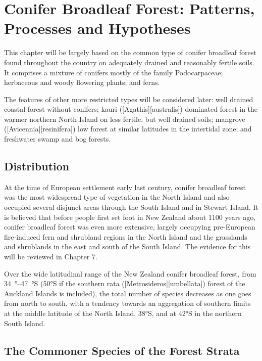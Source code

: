 \chapter{Conifer Broadleaf Forest: Patterns, Processes and Hypotheses}

This chapter will be largely based on the common type of conifer broadleaf forest found throughout the country on adequately drained and reasonably fertile soils.
It comprises a mixture of conifers mostly of the family Podocarpaceae; herbaceous and woody flowering plants; and ferns.

The features of other more restricted types will be considered later: well drained coastal forest without conifers; kauri ([Agathis][australis]) dominated forest in the warmer northern North Island on less fertile, but well drained soils; mangrove ([Avicennia][resinifera]) low forest at similar latitudes in the intertidal zone; and freshwater swamp and bog forests.

\section{Distribution}

At the time of European settlement early last century, conifer broadleaf forest was the most widespread type of vegetation in the North Island and also occupied several disjunct areas through the South Island and in Stewart Island.
It is believed that before people first set foot in New Zealand about 1100 years ago, conifer broadleaf forest was even more extensive, largely occupying pre-European fire-induced fern and shrubland regions in the North Island and the grasslands and shrublands in the east and south of the South Island.
The evidence for this will be reviewed in Chapter 7.

Over the wide latitudinal range of the New Zealand conifer broadleaf forest, from \SIrange{34}{47}{\degree}S (\ang{50}S if the southern rata ([Metrosideros][umbellata]) forest of the Auckland Islands is included), the total number of species decreases as one goes from north to south, with a tendency towards an aggregation of southern limits at the middle latitude of the North Island, \ang{38}S, and at \ang{42}S in the northern South Island.

\section{The Commoner Species of the Forest Strata}

